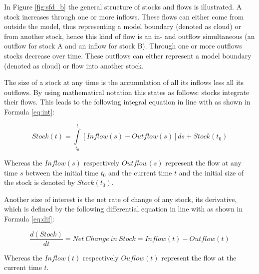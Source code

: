 In Figure \ref{fig:sfd_b} the general structure of stocks and flows is illustrated. A stock increases through one or more inflows. These flows can either come from outside the model, thus representing a model boundary (denoted as cloud) or from another stock, hence this kind of flow is an in- and outflow simultaneous (an outflow for stock A and an inflow for stock B). Through one or more outflows stocks decrease over time. These outflows can either represent a model boundary (denoted as cloud) or flow into another stock.

The size of a stock at any time is the accumulation of all its inflows less all its outflows. By using mathematical notation this states as follows: stocks integrate their flows. This leads to the following integral equation in line with \citet[p. 194]{Sterman2000} as shown in  Formula \ref{eq:int}:

\begin{equation}\label{eq:int}
		Stock(t) = \int\limits_{t_0}^t [Inflow(s) - Outflow(s)]ds + Stock(t_0)
\end{equation}

Whereas the $Inflow(s)$ respectively $Outflow(s)$ represent the flow at any time $s$ between the initial time $t_0$ and the current time $t$ and the initial size of the stock is denoted by $Stock(t_0)$. 

Another size of interest is the net rate of change of any stock, its derivative, which is defined by the following differential equation in line with \citet[p. 194]{Sterman2000} as shown in Formula \ref{eq:dif}:

\begin{equation}\label{eq:dif}
		\frac{d(Stock)}{dt} = \mathit{Net~Change~in~Stock} = Inflow(t) - Outflow(t)
\end{equation}

Whereas the $Inflow(t)$ respectively $Ouflow(t)$ represent the flow at the current time $t$.

